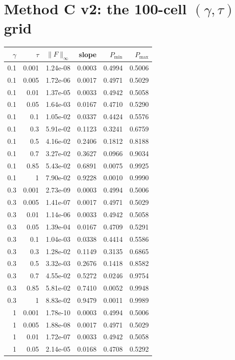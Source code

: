 \section{Method C v2: the 100-cell $(\gamma,\tau)$ grid}
{\small\begin{longtable}{rrrrrr}
\toprule
$\gamma$ & $\tau$ & $\|F\|_\infty$ & slope & $P_{\min}$ & $P_{\max}$ \\
\midrule
\endhead
0.1 & 0.001 & 1.24e-08 & 0.0003 & 0.4994 & 0.5006 \\
0.1 & 0.005 & 1.72e-06 & 0.0017 & 0.4971 & 0.5029 \\
0.1 & 0.01 & 1.37e-05 & 0.0033 & 0.4942 & 0.5058 \\
0.1 & 0.05 & 1.64e-03 & 0.0167 & 0.4710 & 0.5290 \\
0.1 & 0.1 & 1.05e-02 & 0.0337 & 0.4424 & 0.5576 \\
0.1 & 0.3 & 5.91e-02 & 0.1123 & 0.3241 & 0.6759 \\
0.1 & 0.5 & 4.16e-02 & 0.2406 & 0.1812 & 0.8188 \\
0.1 & 0.7 & 3.27e-02 & 0.3627 & 0.0966 & 0.9034 \\
0.1 & 0.85 & 5.43e-02 & 0.6891 & 0.0075 & 0.9925 \\
0.1 & 1 & 7.90e-02 & 0.9228 & 0.0010 & 0.9990 \\
0.3 & 0.001 & 2.73e-09 & 0.0003 & 0.4994 & 0.5006 \\
0.3 & 0.005 & 1.41e-07 & 0.0017 & 0.4971 & 0.5029 \\
0.3 & 0.01 & 1.14e-06 & 0.0033 & 0.4942 & 0.5058 \\
0.3 & 0.05 & 1.39e-04 & 0.0167 & 0.4709 & 0.5291 \\
0.3 & 0.1 & 1.04e-03 & 0.0338 & 0.4414 & 0.5586 \\
0.3 & 0.3 & 1.28e-02 & 0.1149 & 0.3135 & 0.6865 \\
0.3 & 0.5 & 3.32e-03 & 0.2676 & 0.1418 & 0.8582 \\
0.3 & 0.7 & 4.55e-02 & 0.5272 & 0.0246 & 0.9754 \\
0.3 & 0.85 & 5.81e-02 & 0.7410 & 0.0052 & 0.9948 \\
0.3 & 1 & 8.83e-02 & 0.9479 & 0.0011 & 0.9989 \\
1 & 0.001 & 1.78e-10 & 0.0003 & 0.4994 & 0.5006 \\
1 & 0.005 & 1.88e-08 & 0.0017 & 0.4971 & 0.5029 \\
1 & 0.01 & 1.72e-07 & 0.0033 & 0.4942 & 0.5058 \\
1 & 0.05 & 2.14e-05 & 0.0168 & 0.4708 & 0.5292 \\

\end{longtable}}
